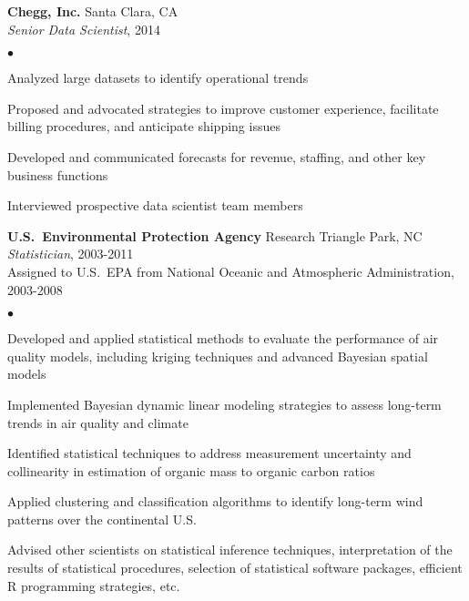\documentclass[11pt]{article}
\def\newempl{\vspace*{0.4cm}}
\begin{document}
\newempl
\textbf{Chegg, Inc.}  \hfill Santa Clara, CA\\
\textit{Senior Data Scientist}, 2014 %

\begin{list}{$\bullet$}{
\setlength{\topsep}{0cm}
\setlength{\partopsep}{0cm}
\setlength{\parsep}{0cm}
\setlength{\itemsep}{0cm}
\setlength{\labelsep}{1ex}
\setlength{\labelwidth}{1em}
\setlength{\leftmargin}{1em}
}
\item Analyzed large datasets to identify operational trends %
\item Proposed and advocated strategies to improve customer experience, facilitate billing procedures, and anticipate shipping issues
\item Developed and communicated forecasts for revenue, staffing, and other key business functions
\item Interviewed prospective data scientist team members
\end{list}



\newempl
\textbf{U.S.\ Environmental Protection Agency}  \hfill Research Triangle Park, NC\\
\textit{Statistician}, 2003-2011\\
Assigned to U.S.~EPA from National Oceanic and Atmospheric Administration,
2003-2008

\begin{list}{$\bullet$}{
\setlength{\topsep}{0cm}
\setlength{\partopsep}{0cm}
\setlength{\parsep}{0cm}
\setlength{\itemsep}{0cm}
\setlength{\labelsep}{1ex}
\setlength{\labelwidth}{1em}
\setlength{\leftmargin}{1em}
}
\item Developed and applied statistical methods to evaluate the performance of air quality models, including kriging techniques and advanced Bayesian spatial models
\item Implemented Bayesian dynamic linear modeling strategies to assess long-term trends in air quality and climate
\item Identified statistical techniques to address measurement uncertainty and collinearity in estimation of organic mass to organic carbon ratios
\item Applied clustering and classification algorithms to identify long-term wind patterns over the continental U.S.
\item Advised other scientists on statistical inference techniques,
  interpretation of the results of statistical procedures, selection
  of statistical software packages, efficient R programming strategies, etc.
\end{list}
\end{document}
